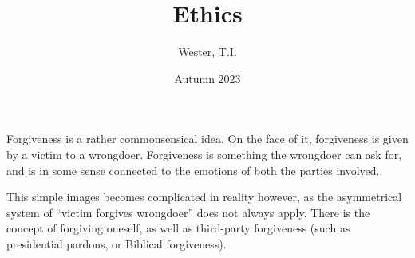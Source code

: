 \documentclass[12pt]{report}
\title{Ethics}
\date{Autumn 2023}
\author{Wester, T.I.}
\begin{document}
\maketitle
\tableofcontents

\chapter{}

Forgiveness is a rather commonsensical idea. On the face of it, forgiveness is
given by a victim to a wrongdoer. Forgiveness is something the wrongdoer can
ask for, and is in some sense connected to the emotions of both the parties
involved.

This simple images becomes complicated in reality however, as the asymmetrical
system of ``victim forgives wrongdoer'' does not always apply. There is the
concept of forgiving oneself, as well as third-party forgiveness (such as
presidential pardons, or Biblical forgiveness).
\end{document}
